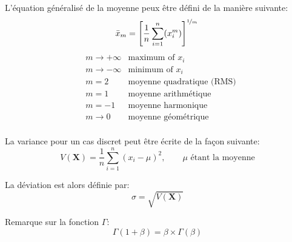 \documentclass[12pt, oneside]{report}
\begin{document}
L’équation généralisé de la moyenne peux être défini de la manière suivante:
\begin{equation}\label{eq:moyenne_generale}
    \bar{x}_{m} = \left[ \frac{1}{n} \sum_{i=1}^{n}(x_{i}^{m})\right]^{\nicefrac{1}{m}}\\
\end{equation}
\begin{align*}\label{eq:parametre_m}
    & m \to +\infty  & \text{maximum of } x_{i}\\
    & m \to -\infty & \text{minimum of } x_{i}\\
    & m = 2         & \text{moyenne quadratique (RMS)}\\
    & m = 1         & \text{moyenne arithmétique}\\
    & m = -1        & \text{moyenne harmonique}\\
    & m \to 0       & \text{moyenne géométrique}\\
\end{align*}

La variance pour un cas discret peut être écrite de la façon suivante:
\begin{equation}
    V(\mathbf{X}) = \frac{1}{n} \sum_{i=1}^{n} (x_{i} - \mu)^{2}, \qquad \mu \text{ étant la moyenne}
\end{equation}

La déviation est alors définie par:
\begin{equation}
    \sigma = \sqrt{V(\mathbf{X})}
\end{equation}


Remarque sur la fonction $\Gamma$:
\begin{equation}
    \Gamma(1+\beta) = \beta \times \Gamma(\beta)
\end{equation}
\end{document}

